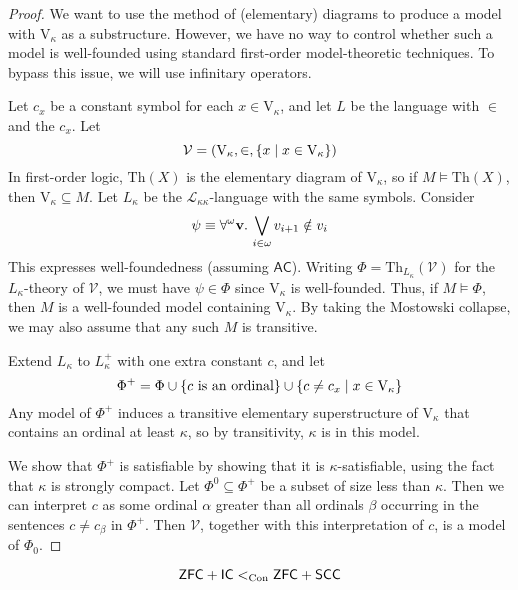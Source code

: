 \begin{proof}
    We want to use the method of (elementary) diagrams to produce a model with \( \mathrm{V}_\kappa \) as a substructure.
    However, we have no way to control whether such a model is well-founded using standard first-order model-theoretic techniques.
    To bypass this issue, we will use infinitary operators.

    Let \( c_x \) be a constant symbol for each \( x \in \mathrm{V}_\kappa \), and let \( L \) be the language with \( \in \) and the \( c_x \).
    Let
    \[ \mathcal V = (\mathrm{V}_\kappa, \in, \qty{x \mid x \in \mathrm{V}_\kappa}) \]
    In first-order logic, \( \mathrm{Th}(X) \) is the elementary diagram of \( \mathrm{V}_\kappa \), so if \( M \vDash \mathrm{Th}(X) \), then \( \mathrm{V}_\kappa \subseteq M \).
    Let \( L_{\kappa} \) be the \( \mathcal L_{\kappa\kappa} \)-language with the same symbols.
    Consider
    \[ \psi \equiv \forall^\omega \vb v.\, \bigvee_{i \in \omega} v_{i+1} \notin v_i \]
    This expresses well-foundedness (assuming \( \mathsf{AC} \)).
    Writing \( \Phi = \mathrm{Th}_{L_\kappa}(\mathcal V) \) for the \( L_\kappa \)-theory of \( \mathcal V \), we must have \( \psi \in \Phi \) since \( \mathrm{V}_\kappa \) is well-founded.
    Thus, if \( M \vDash \Phi \), then \( M \) is a well-founded model containing \( \mathrm{V}_\kappa \).
    By taking the Mostowski collapse, we may also assume that any such \( M \) is transitive.

    Extend \( L_\kappa \) to \( L_\kappa^+ \) with one extra constant \( c \), and let
    \[ \Phi^+ = \Phi \cup \qty{c \text{ is an ordinal}} \cup \qty{c \neq c_x \mid x \in \mathrm{V}_\kappa} \]
    Any model of \( \Phi^+ \) induces a transitive elementary superstructure of \( \mathrm{V}_\kappa \) that contains an ordinal at least \( \kappa \), so by transitivity, \( \kappa \) is in this model.

    We show that \( \Phi^+ \) is satisfiable by showing that it is \( \kappa \)-satisfiable, using the fact that \( \kappa \) is strongly compact.
    Let \( \Phi^0 \subseteq \Phi^+ \) be a subset of size less than \( \kappa \).
    Then we can interpret \( c \) as some ordinal \( \alpha \) greater than all ordinals \( \beta \) occurring in the sentences \( c \neq c_\beta \) in \( \Phi^+ \).
    Then \( \mathcal V \), together with this interpretation of \( c \), is a model of \( \Phi_0 \).
\end{proof}
\begin{corollary}
    \[ \mathsf{ZFC} + \mathsf{IC} <_{\operatorname{Con}} \mathsf{ZFC} + \mathsf{SCC} \]
\end{corollary}
